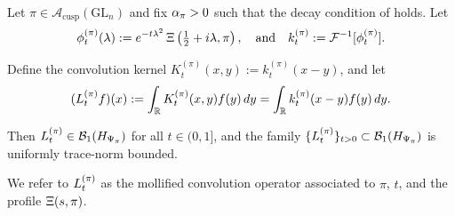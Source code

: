\begin{definition}
\label{def:convolution_operator_Ltpi}
Let \( \pi \in \mathcal{A}_{\mathrm{cusp}}(\mathrm{GL}_n) \) and fix \( \alpha_{\pi} > 0 \) such that the decay condition of  holds. Let
\[
\phi_t^{(\pi)}(\lambda) := e^{-t\lambda^2} \, \Xi\left(\tfrac{1}{2} + i\lambda, \pi\right),
\quad \text{and} \quad
k_t^{(\pi)} := \mathcal{F}^{-1}[\phi_t^{(\pi)}].
\]

Define the convolution kernel \( K_t^{(\pi)}(x, y) := k_t^{(\pi)}(x - y) \), and let
\[
(L_t^{(\pi)} f)(x) := \int_{\mathbb{R}} K_t^{(\pi)}(x, y) f(y) \, dy = \int_{\mathbb{R}} k_t^{(\pi)}(x - y) f(y) \, dy.
\]

Then \( L_t^{(\pi)} \in \mathcal{B}_1(H_{\Psi_{\pi}}) \) for all \( t \in (0, 1] \), and the family \( \{ L_t^{(\pi)} \}_{t > 0} \subset \mathcal{B}_1(H_{\Psi_{\pi}}) \) is uniformly trace-norm bounded.

We refer to \( L_t^{(\pi)} \) as the mollified convolution operator associated to \( \pi \), \( t \), and the profile \( \Xi(s, \pi) \).
\end{definition}
